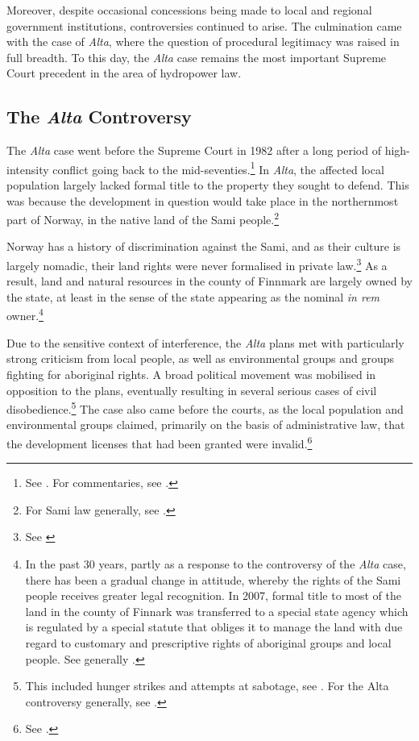 Moreover, despite occasional concessions being made to local and regional government institutions, controversies continued to arise. The culmination came with the case of {\it Alta}, where the question of procedural legitimacy was raised in full breadth. To this day, the {\it Alta} case remains the most important Supreme Court precedent in the area of hydropower law.

\subsection{The {\it Alta} Controversy}\label{sec:alta}

The {\it Alta} case went before the Supreme Court in 1982 after a long period of high-intensity conflict going back to the mid-seventies.\footnote{See \cite{alta82}. For commentaries, see \cite{eckhoff82,boe83,hagvar88}.} In {\it Alta}, the affected local population largely lacked formal title to the property they sought to defend. This was because the development in question would take place in the northernmost part of Norway, in the native land of the Sami people.\footnote{For Sami law generally, see \cite{skogvang02}.}

Norway has a history of discrimination against the Sami, and as their culture is largely nomadic, their land rights were never formalised in private law.\footnote{See \cite[149-156]{ravna12s}} As a result, land and natural resources in the county of Finnmark are largely owned by the state, at least in the sense of the state appearing as the nominal {\it in rem} owner.\footnote{In the past 30 years, partly as a response to the controversy of the {\it Alta} case, there has been a gradual change in attitude, whereby the rights of the Sami people receives greater legal recognition. In 2007, formal title to most of the land in the county of Finnark was transferred to a special state agency which is regulated by a special statute that obliges it to manage the land with due regard to customary and prescriptive rights of aboriginal groups and local people. See generally \cite{bull07}.}

Due to the sensitive context of interference, the {\it Alta} plans met with particularly strong criticism from local people, as well as environmental groups and groups fighting for aboriginal rights. A broad political movement was mobilised in opposition to the plans, eventually resulting in several serious cases of civil disobedience.\footnote{This included hunger strikes and attempts at sabotage, see \cite[80-83]{nilsen08}. For the Alta controversy generally, see \cite{altawiki,hjorthol06}.} The case also came before the courts, as the local population and environmental groups claimed, primarily on the basis of administrative law, that the development licenses that had been granted were invalid.\footnote{See \cite{eckhoff82}.}

